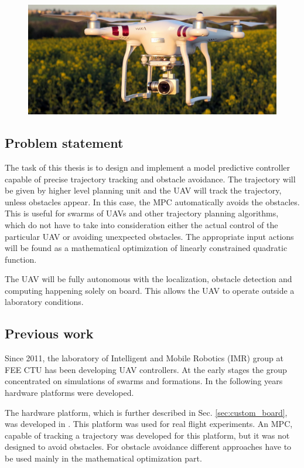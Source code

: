 \documentclass[a4paper,11pt,titlepage]{article}
\begin{document}
\begin{figure}[h]
\centering
\includegraphics[width=1\linewidth]{fig/phantom.jpg}
\label{fig:phantom}
\end{figure}

\subsection{Problem statement}
The task of this thesis is to design and implement a model predictive controller capable of precise trajectory tracking and obstacle avoidance. The trajectory will be given by higher level planning unit and the UAV will track the trajectory, unless obstacles appear. In this case, the MPC automatically avoids the obstacles. This is useful for swarms of UAVs and other trajectory planning algorithms, which do not have to take into consideration either the actual control of the particular UAV or avoiding unexpected obstacles. The appropriate input actions will be found as a mathematical optimization of linearly constrained quadratic function. 

The UAV will be fully autonomous with the localization, obstacle detection and computing happening solely on board. This allows the UAV to operate outside a laboratory conditions. 

\subsection{Previous work}
Since 2011, the laboratory of Intelligent and Mobile Robotics (IMR) group at FEE CTU has been developing UAV controllers. At the early stages the group concentrated on simulations of swarms and formations. In the following years hardware platforms were developed. 

The hardware platform, which is further described in Sec. \ref{sec:custom_board}, was developed in \cite{tomas}. This platform was used for real flight experiments. An MPC, capable of tracking a trajectory was developed for this platform, but it was not designed to avoid obstacles. For obstacle avoidance different approaches have to be used mainly in the mathematical optimization part.
\end{document}
